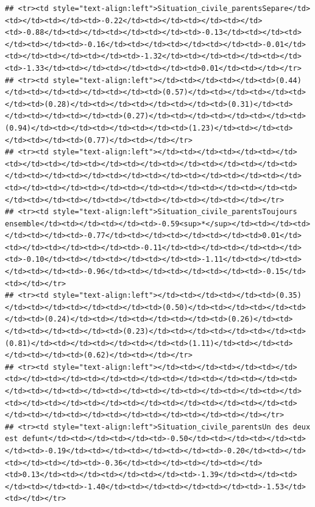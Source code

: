 \documentclass[
]{article}
\begin{document}
\begin{verbatim}
## <tr><td style="text-align:left">Situation_civile_parentsSepare</td><td></td><td></td><td>-0.22</td><td></td><td></td><td></td><td>-0.88</td><td></td><td></td><td></td><td>-0.13</td><td></td><td></td><td></td><td>-0.16</td><td></td><td></td><td></td><td>-0.01</td><td></td><td></td><td></td><td>-1.32</td><td></td><td></td><td></td><td>-1.33</td><td></td><td></td><td></td><td>0.01</td><td></td></tr>
## <tr><td style="text-align:left"></td><td></td><td></td><td>(0.44)</td><td></td><td></td><td></td><td>(0.57)</td><td></td><td></td><td></td><td>(0.28)</td><td></td><td></td><td></td><td>(0.31)</td><td></td><td></td><td></td><td>(0.27)</td><td></td><td></td><td></td><td>(0.94)</td><td></td><td></td><td></td><td>(1.23)</td><td></td><td></td><td></td><td>(0.77)</td><td></td></tr>
## <tr><td style="text-align:left"></td><td></td><td></td><td></td><td></td><td></td><td></td><td></td><td></td><td></td><td></td><td></td><td></td><td></td><td></td><td></td><td></td><td></td><td></td><td></td><td></td><td></td><td></td><td></td><td></td><td></td><td></td><td></td><td></td><td></td><td></td><td></td><td></td></tr>
## <tr><td style="text-align:left">Situation_civile_parentsToujours ensemble</td><td></td><td></td><td>-0.59<sup>*</sup></td><td></td><td></td><td></td><td>-0.77</td><td></td><td></td><td></td><td>0.01</td><td></td><td></td><td></td><td>-0.11</td><td></td><td></td><td></td><td>-0.10</td><td></td><td></td><td></td><td>-1.11</td><td></td><td></td><td></td><td>-0.96</td><td></td><td></td><td></td><td>-0.15</td><td></td></tr>
## <tr><td style="text-align:left"></td><td></td><td></td><td>(0.35)</td><td></td><td></td><td></td><td>(0.50)</td><td></td><td></td><td></td><td>(0.24)</td><td></td><td></td><td></td><td>(0.26)</td><td></td><td></td><td></td><td>(0.23)</td><td></td><td></td><td></td><td>(0.81)</td><td></td><td></td><td></td><td>(1.11)</td><td></td><td></td><td></td><td>(0.62)</td><td></td></tr>
## <tr><td style="text-align:left"></td><td></td><td></td><td></td><td></td><td></td><td></td><td></td><td></td><td></td><td></td><td></td><td></td><td></td><td></td><td></td><td></td><td></td><td></td><td></td><td></td><td></td><td></td><td></td><td></td><td></td><td></td><td></td><td></td><td></td><td></td><td></td><td></td></tr>
## <tr><td style="text-align:left">Situation_civile_parentsUn des deux est defunt</td><td></td><td></td><td>-0.50</td><td></td><td></td><td></td><td>-0.19</td><td></td><td></td><td></td><td>-0.20</td><td></td><td></td><td></td><td>-0.36</td><td></td><td></td><td></td><td>0.13</td><td></td><td></td><td></td><td>-1.39</td><td></td><td></td><td></td><td>-1.40</td><td></td><td></td><td></td><td>-1.53</td><td></td></tr>

\end{verbatim}
\end{document}
